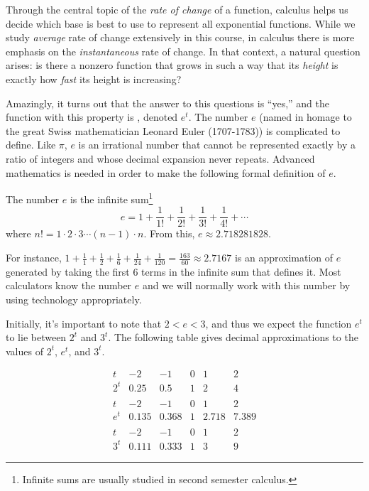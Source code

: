 \documentclass[nooutcomes]{ximera}
\begin{document}
Through the central topic of the \emph{rate of change} of a function, calculus helps us decide which base is best to use to represent all exponential functions.  While we study \emph{average} rate of change extensively in this course, in calculus there is more emphasis on the \emph{instantaneous} rate of change.  In that context, a natural question arises: is there a nonzero function that grows in such a way that its \emph{height} is exactly how \emph{fast} its height is increasing?

Amazingly, it turns out that the answer to this questions is ``yes,'' and the function with this property is , denoted $e^t$. The number $e$ (named in homage to the great Swiss mathematician Leonard Euler (1707-1783)) is complicated to define.  Like $\pi$, $e$ is an irrational number that cannot be represented exactly by a ratio of integers and whose decimal expansion never repeats.  Advanced mathematics is needed in order to make the following formal definition of $e$.%

\begin{definition}
The number $e$ is the infinite sum\footnote{Infinite sums are usually studied in second semester calculus.\label{fn-28}}%
\begin{equation*}
e = 1 + \frac{1}{1!} + \frac{1}{2!} + \frac{1}{3!} + \frac{1}{4!} + \cdots
\end{equation*}
where $n! = 1\cdot2\cdot3\cdots(n -1)\cdot n$.
From this, $e \approx 2.718281828$.%
\end{definition}

For instance, $1 + \frac{1}{1} + \frac{1}{2} + \frac{1}{6} + \frac{1}{24} + \frac{1}{120} = \frac{163}{60} \approx 2.7167$ is an approximation of $e$ generated by taking the first $6$ terms in the infinite sum that defines it.  Most calculators know the number $e$ and we will normally work with this number by using technology appropriately.

Initially, it's important to note that $2 < e < 3$, and thus we expect the function $e^t$ to lie between $2^t$ and $3^t$. The following table gives decimal approximations to the values of $2^t$, $e^t$, and $3^t$. 

$$
\begin{array}{cccccc}
t&-2&-1&0&1&2\\
\hline
2^t&0.25&0.5&1&2&4\\
&&&&\\
t&-2&-1&0&1&2\\
\hline
e^t&0.135&0.368&1&2.718&7.389\\
&&&&\\
t&-2&-1&0&1&2\\
\hline
3^t&0.111&0.333&1&3&9
\end{array}
$$
\end{document}
